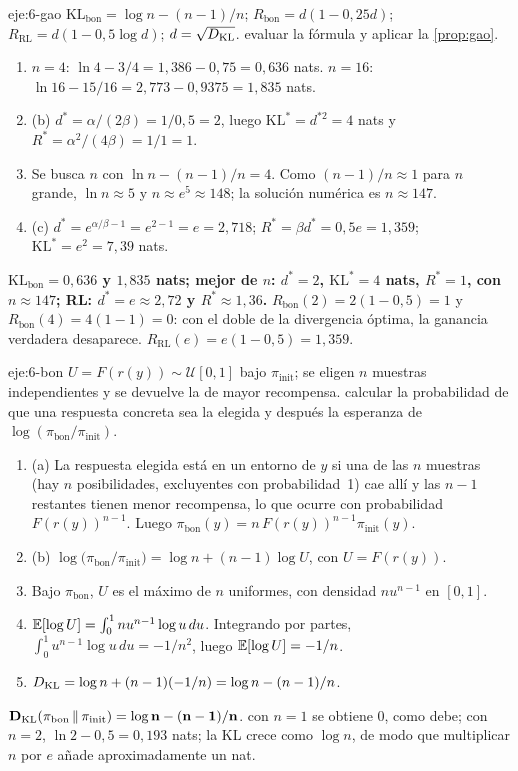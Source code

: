 \begin{solucion}{eje:6-gao}
\datos $\mathrm{KL}_{\mathrm{bon}}=\log n-(n-1)/n$; $R_{\mathrm{bon}}=d(1-0{,}25d)$; $R_{\mathrm{RL}}=d(1-0{,}5\log d)$; $d=\sqrt{D_{\mathrm{KL}}}$.
\planteamiento evaluar la fórmula y aplicar la \cref{prop:gao}.
\pasos
\begin{enumerate}[label=\arabic*.]
  \item $n=4$: $\ln 4-3/4=1{,}386-0{,}75=0{,}636$ nats. $n=16$: $\ln 16-15/16=2{,}773-0{,}9375=1{,}835$ nats.
  \item (b) $d^{*}=\alpha/(2\beta)=1/0{,}5=2$, luego $\mathrm{KL}^{*}=d^{*2}=4$ nats y $R^{*}=\alpha^{2}/(4\beta)=1/1=1$.
  \item Se busca $n$ con $\ln n-(n-1)/n=4$. Como $(n-1)/n\approx 1$ para $n$ grande, $\ln n\approx 5$ y $n\approx e^{5}\approx 148$; la solución numérica es $n\approx 147$.
  \item (c) $d^{*}=e^{\alpha/\beta-1}=e^{2-1}=e=2{,}718$; $R^{*}=\beta d^{*}=0{,}5e=1{,}359$; $\mathrm{KL}^{*}=e^{2}=7{,}39$ nats.
\end{enumerate}
\resultado \textbf{$\mathrm{KL}_{\mathrm{bon}}=0{,}636$ y $1{,}835$ nats; mejor de $n$: $d^{*}=2$, $\mathrm{KL}^{*}=4$ nats, $R^{*}=1$, con $n\approx 147$; RL: $d^{*}=e\approx 2{,}72$ y $R^{*}\approx 1{,}36$.}
\comprobacion $R_{\mathrm{bon}}(2)=2(1-0{,}5)=1$ y $R_{\mathrm{bon}}(4)=4(1-1)=0$: con el doble de la divergencia óptima, la ganancia verdadera desaparece. $R_{\mathrm{RL}}(e)=e(1-0{,}5)=1{,}359$.
\end{solucion}

\begin{solucion}{eje:6-bon}
\datos $U=F(r(y))\sim\mathcal{U}[0,1]$ bajo $\pi_{\mathrm{init}}$; se eligen $n$ muestras independientes y se devuelve la de mayor recompensa.
\planteamiento calcular la probabilidad de que una respuesta concreta sea la elegida y después la esperanza de $\log(\pi_{\mathrm{bon}}/\pi_{\mathrm{init}})$.
\pasos
\begin{enumerate}[label=\arabic*.]
  \item (a) La respuesta elegida está en un entorno de $y$ si una de las $n$ muestras (hay $n$ posibilidades, excluyentes con probabilidad~1) cae allí y las $n-1$ restantes tienen menor recompensa, lo que ocurre con probabilidad $F(r(y))^{n-1}$. Luego $\pi_{\mathrm{bon}}(y)=n\,F(r(y))^{n-1}\pi_{\mathrm{init}}(y)$.
  \item (b) $\log\bigl(\pi_{\mathrm{bon}}/\pi_{\mathrm{init}}\bigr)=\log n+(n-1)\log U$, con $U=F(r(y))$.
  \item Bajo $\pi_{\mathrm{bon}}$, $U$ es el máximo de $n$ uniformes, con densidad $n u^{n-1}$ en $[0,1]$.
  \item $\mathbb{E}[\log U]=\int_0^{1}n u^{n-1}\log u\,du$. Integrando por partes, $\int_0^{1}u^{n-1}\log u\,du=-1/n^{2}$, luego $\mathbb{E}[\log U]=-1/n$.
  \item $D_{\mathrm{KL}}=\log n+(n-1)(-1/n)=\log n-(n-1)/n$.
\end{enumerate}
\resultado $\mathbf{D_{\mathrm{KL}}(\pi_{\mathrm{bon}}\,\|\,\pi_{\mathrm{init}})=\log n-(n-1)/n}$.
\comprobacion con $n=1$ se obtiene $0$, como debe; con $n=2$, $\ln 2-0{,}5=0{,}193$ nats; la KL crece como $\log n$, de modo que multiplicar $n$ por $e$ añade aproximadamente un nat.
\end{solucion}

